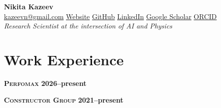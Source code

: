 \documentclass[11pt,a4paper]{article}
\begin{document}
\begin{center}
  {\LARGE\bfseries Nikita Kazeev}\\[3pt]
  {\small
    \href{mailto:kazeevn@gmail.com}{kazeevn@gmail.com} \textperiodcentered{}
    \href{https://kazeevn.github.io}{Website} \textperiodcentered{}
    \href{https://github.com/kazeevn}{GitHub} \textperiodcentered{}
    \href{https://linkedin.com/in/nikita-kazeev}{LinkedIn} \textperiodcentered{}
    \href{https://scholar.google.com/citations?user=vamy2okAAAAJ}{Google Scholar} \textperiodcentered{}
    \href{https://orcid.org/0000-0002-5699-7634}{ORCID}%
  }\\[5pt]
  \textit{ Research Scientist at the intersection of AI and Physics }
\end{center}

\section{Work Experience}
\textsc{\textbf{\boldmath{}Perfomax}} \hfill\textbf{2026--present}\par
\smallskip

\textsc{\textbf{\boldmath{}Constructor Group}} \hfill\textbf{2021--present}\par
\smallskip
\end{document}
